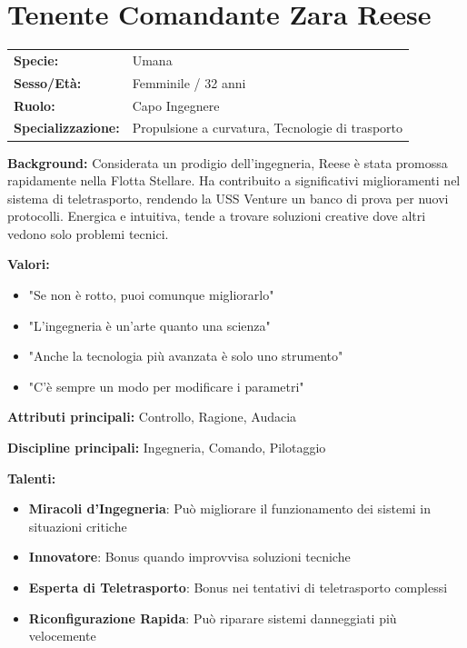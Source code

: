 \documentclass[11pt,a4paper]{article}
\begin{document}
\section{Tenente Comandante Zara Reese}

\begin{tcolorbox}[colback=fedlightblue!10, colframe=fedblue]
\begin{tabularx}{\textwidth}{lX}
\textbf{Specie:} & Umana \\
\textbf{Sesso/Età:} & Femminile / 32 anni \\
\textbf{Ruolo:} & Capo Ingegnere \\
\textbf{Specializzazione:} & Propulsione a curvatura, Tecnologie di trasporto \\
\end{tabularx}

\textbf{Background:} Considerata un prodigio dell'ingegneria, Reese è stata promossa rapidamente nella Flotta Stellare. Ha contribuito a significativi miglioramenti nel sistema di teletrasporto, rendendo la USS Venture un banco di prova per nuovi protocolli. Energica e intuitiva, tende a trovare soluzioni creative dove altri vedono solo problemi tecnici.

\textbf{Valori:}
\begin{itemize}[leftmargin=*]
\item "Se non è rotto, puoi comunque migliorarlo"
\item "L'ingegneria è un'arte quanto una scienza"
\item "Anche la tecnologia più avanzata è solo uno strumento"
\item "C'è sempre un modo per modificare i parametri"
\end{itemize}

\textbf{Attributi principali:} Controllo, Ragione, Audacia

\textbf{Discipline principali:} Ingegneria, Comando, Pilotaggio

\textbf{Talenti:}
\begin{itemize}[leftmargin=*]
\item \textbf{Miracoli d'Ingegneria}: Può migliorare il funzionamento dei sistemi in situazioni critiche
\item \textbf{Innovatore}: Bonus quando improvvisa soluzioni tecniche
\item \textbf{Esperta di Teletrasporto}: Bonus nei tentativi di teletrasporto complessi
\item \textbf{Riconfigurazione Rapida}: Può riparare sistemi danneggiati più velocemente
\end{itemize}
\end{tcolorbox}
\end{document}
